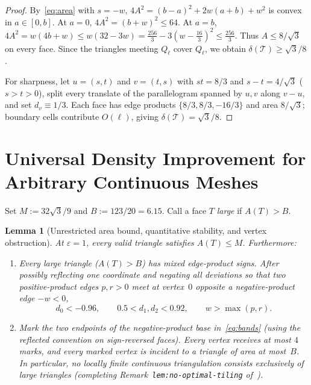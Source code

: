 \documentclass[11pt]{article}
\theoremstyle{plain}
\newtheorem{lemma}[theorem]{Lemma}
\theoremstyle{definition}
\theoremstyle{remark}
\begin{document}
\begin{proof}
By~\eqref{eq:area} with $s = -w$, $4A^2 = (b-a)^2 + 2w(a+b) + w^2$ is convex in $a \in [0,b]$.
At $a = 0$, $4A^2 = (b+w)^2 \le 64$.
At $a = b$, $4A^2 = w(4b + w) \le w(32 - 3w) = \frac{256}{3} - 3(w - \frac{16}{3})^2 \le \frac{256}{3}$.
Thus $A \le 8/\sqrt{3}$ on every face.
Since the triangles meeting $Q_\ell$ cover $Q_\ell$, we obtain $\delta(\mathcal{T}) \ge \sqrt{3}/8$.

For sharpness, let $u = (s, t)$ and $v = (t, s)$ with $st = 8/3$ and $s - t = 4/\sqrt{3}$ ($s > t > 0$), split every translate of the parallelogram spanned by $u, v$ along $v - u$, and set $d_v \equiv 1/3$.
Each face has edge products $\{8/3, 8/3, -16/3\}$ and area $8/\sqrt{3}$; boundary cells contribute $O(\ell)$, giving $\delta(\mathcal{T}) = \sqrt{3}/8$.
\end{proof}

\section{Universal Density Improvement for Arbitrary Continuous Meshes}

Set $M := 32\sqrt{3}/9$ and $B := 123/20 = 6.15$. Call a face $T$ \emph{large} if $A(T) > B$.

\begin{lemma}[Unrestricted area bound, quantitative stability, and vertex obstruction]\label{lem:obstruction}
At $\varepsilon = 1$, every valid triangle satisfies $A(T) \le M$. Furthermore:
\begin{enumerate}[label=\textup{(\arabic*)}]
\item Every large triangle ($A(T) > B$) has mixed edge-product signs. After possibly reflecting one coordinate and negating all deviations so that two positive-product edges $p, r > 0$ meet at vertex~$0$ opposite a negative-product edge $-w < 0$,
\begin{equation}\label{eq:bands}
d_0 < -0.96, \qquad 0.5 < d_1, d_2 < 0.92, \qquad w > \max(p, r).
\end{equation}
\item Mark the two endpoints of the negative-product base in~\eqref{eq:bands} (using the reflected convention on sign-reversed faces). Every vertex receives at most $4$ marks, and every marked vertex is incident to a triangle of area at most~$B$. In particular, no locally finite continuous triangulation consists exclusively of large triangles (completing Remark~\texttt{lem:no-optimal-tiling} of~\cite{Burlacu2026}).
\end{enumerate}
\end{lemma}
\end{document}
